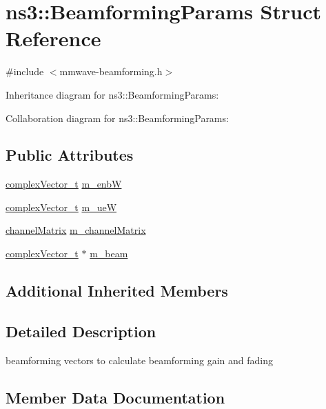 \hypertarget{structns3_1_1BeamformingParams}{}\section{ns3\+:\+:Beamforming\+Params Struct Reference}
\label{structns3_1_1BeamformingParams}


{\ttfamily \#include $<$mmwave-\/beamforming.\+h$>$}



Inheritance diagram for ns3\+:\+:Beamforming\+Params\+:


Collaboration diagram for ns3\+:\+:Beamforming\+Params\+:
\subsection*{Public Attributes}
\begin{DoxyCompactItemize}
\item 
\hyperlink{namespacens3_a6a7f75817ae50e6ac47414955b17d926}{complex\+Vector\+\_\+t} \hyperlink{structns3_1_1BeamformingParams_acf5be5fe531aa4952eeaea17f2dd9b6d}{m\+\_\+enbW}
\item 
\hyperlink{namespacens3_a6a7f75817ae50e6ac47414955b17d926}{complex\+Vector\+\_\+t} \hyperlink{structns3_1_1BeamformingParams_a97c8af6224a21db36501eef88b6d8c31}{m\+\_\+ueW}
\item 
\hyperlink{structns3_1_1channelMatrix}{channel\+Matrix} \hyperlink{structns3_1_1BeamformingParams_af70d94a1f6a7317d20897158eed1f391}{m\+\_\+channel\+Matrix}
\item 
\hyperlink{namespacens3_a6a7f75817ae50e6ac47414955b17d926}{complex\+Vector\+\_\+t} $\ast$ \hyperlink{structns3_1_1BeamformingParams_a61d7ab0e34f1dc99b54499d40ba82478}{m\+\_\+beam}
\end{DoxyCompactItemize}
\subsection*{Additional Inherited Members}


\subsection{Detailed Description}
beamforming vectors to calculate beamforming gain and fading 

\subsection{Member Data Documentation}
